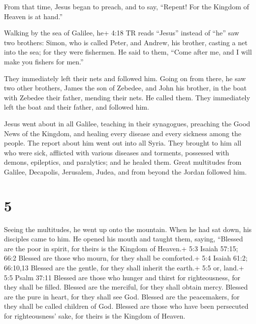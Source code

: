  From that time, Jesus began to preach, and to say,
``Repent! For the Kingdom of Heaven is at hand.''

 Walking by the sea of Galilee, he+ 4:18 TR reads ``Jesus''
instead of ``he'' saw two brothers: Simon, who is called Peter, and
Andrew, his brother, casting a net into the sea; for they were
fishermen.  He said to them, ``Come after me, and I will
make you fishers for men.''

 They immediately left their nets and followed him.
 Going on from there, he saw two other brothers, James the
son of Zebedee, and John his brother, in the boat with Zebedee their
father, mending their nets. He called them.  They
immediately left the boat and their father, and followed him.

 Jesus went about in all Galilee, teaching in their
synagogues, preaching the Good News of the Kingdom, and healing every
disease and every sickness among the people.  The report
about him went out into all Syria. They brought to him all who were
sick, afflicted with various diseases and torments, possessed with
demons, epileptics, and paralytics; and he healed them. 
Great multitudes from Galilee, Decapolis, Jerusalem, Judea, and from
beyond the Jordan followed him.

\hypertarget{section-4}{%
\section{5}\label{section-4}}

 Seeing the multitudes, he went up onto the mountain. When
he had sat down, his disciples came to him.  He opened his
mouth and taught them, saying,  ``Blessed are the poor in
spirit, for theirs is the Kingdom of Heaven.+ 5:3 Isaiah 57:15; 66:2
 Blessed are those who mourn, for they shall be comforted.+
5:4 Isaiah 61:2; 66:10,13  Blessed are the gentle, for they
shall inherit the earth.+ 5:5 or, land.+ 5:5 Psalm 37:11 
Blessed are those who hunger and thirst for righteousness, for they
shall be filled.  Blessed are the merciful, for they shall
obtain mercy.  Blessed are the pure in heart, for they shall
see God.  Blessed are the peacemakers, for they shall be
called children of God.  Blessed are those who have been
persecuted for righteousness' sake, for theirs is the Kingdom of Heaven.

